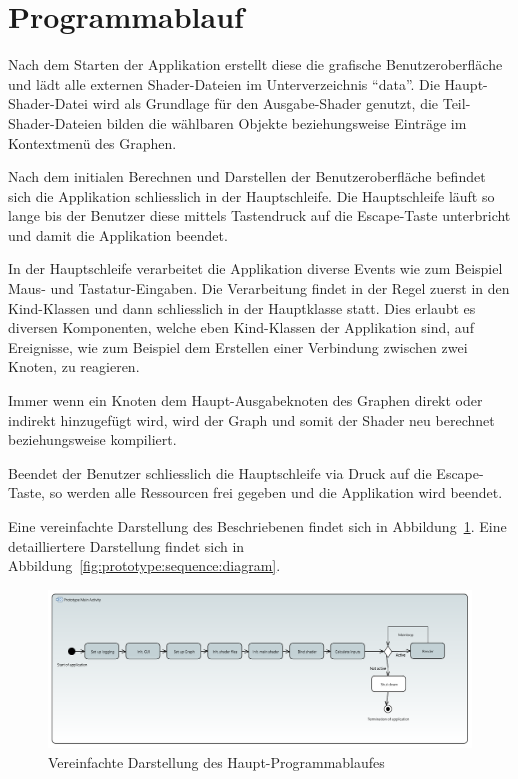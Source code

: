 
\section{Programmablauf}
\label{sec:prototype:sequence}

Nach dem Starten der Applikation erstellt diese die grafische
Benutzeroberfläche und lädt alle externen Shader-Dateien im Unterverzeichnis 
``data''. Die Haupt-Shader-Datei wird als Grundlage für den Ausgabe-Shader
genutzt, die Teil-Shader-Dateien bilden die wählbaren Objekte beziehungsweise
Einträge im Kontextmenü des Graphen.

Nach dem initialen Berechnen und Darstellen der Benutzeroberfläche befindet
sich die Applikation schliesslich in der Hauptschleife. Die Hauptschleife läuft
so lange bis der Benutzer diese mittels Tastendruck auf die Escape-Taste
unterbricht und damit die Applikation beendet.

In der Hauptschleife verarbeitet die Applikation diverse Events wie zum
Beispiel Maus- und Tastatur-Eingaben. Die Verarbeitung findet in der Regel
zuerst in den Kind-Klassen und dann schliesslich in der Hauptklasse statt. Dies
erlaubt es diversen Komponenten, welche eben Kind-Klassen der Applikation sind,
auf Ereignisse, wie zum Beispiel dem Erstellen einer Verbindung zwischen zwei
Knoten, zu reagieren.

Immer wenn ein Knoten dem Haupt-Ausgabeknoten des Graphen direkt oder indirekt
hinzugefügt wird, wird der Graph und somit der Shader neu berechnet
beziehungsweise kompiliert.

Beendet der Benutzer schliesslich die Hauptschleife via Druck auf die
Escape-Taste, so werden alle Ressourcen frei gegeben und die Applikation wird
beendet.

Eine vereinfachte Darstellung des Beschriebenen findet sich in
Abbildung~\ref{fig:prototype:sequence:activity}. Eine detailliertere
Darstellung findet sich in Abbildung~\ref{fig:prototype:sequence:diagram}.

\begin{figure}[H]
    \centering
    \includegraphics[width=1.0\textwidth]{img/prototype_activity_diagram.PDF}
    \caption{Vereinfachte Darstellung des
        Haupt-Programmablaufes}\label{fig:prototype:sequence:activity}
\end{figure}

